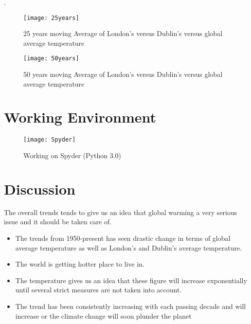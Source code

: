 \documentclass[10pt,journal,compsoc]{IEEEtran}
\begin{document}
. \cite{lamport1994latex}

\begin{figure}[thpb]
      \centering
      \texttt{[image: 25years]}
      \caption{25 years moving Average of London's versus Dublin's versus global average temperature}
      \label{fig: 25 years moving average of London's versus Dublin's versus global average temperature}
\end{figure}

\begin{figure}[thpb]
      \centering
      \texttt{[image: 50years]}
      \caption{50 years moving Average of London's versus Dublin's versus global average temperature}
      \label{fig: 50 years moving average of London's versus Dublin's versus global average temperature}
\end{figure}


\section{Working Environment}
\begin{figure}[thpb]
      \centering
      \texttt{[image: Spyder]}
      \caption{Working on Spyder (Python 3.0)}
      \label{fig: Working with Spyder}
\end{figure}

\section{Discussion}
The overall trends tends to give us an idea that global warming a very serious issue and it should be taken care of.
\begin{itemize}
\item  The trends from 1950-present has seen drastic change in terms of global average temperature as well as London's and Dublin's average temperature.
\item The world is getting hotter place to live in. 
\item The temperature gives us an idea that these figure will increase exponentially until several strict measures are not taken into account. \item The trend has been consistently increasing with each passing decade and will increase or the climate change will soon plunder the planet
\end{itemize}



\end{document}
